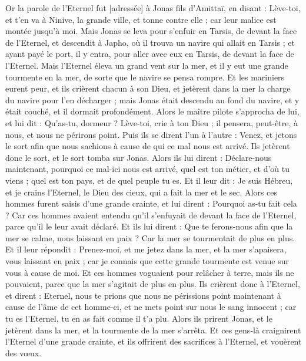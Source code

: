 \BFont
\begin{multicols}{2}
\VerseOne{}Or la parole de l'Eternel fut [adressée] à Jonas fils d'Amittaï, en disant :
Lève-toi, et t'en va à Ninive, la grande ville, et tonne contre elle ; car leur malice est montée jusqu'à moi.
Mais Jonas se leva pour s'enfuir en Tarsis, de devant la face de l'Eternel, et descendit à Japho, où il trouva un navire qui allait en Tarsis ; et ayant payé le port, il y entra, pour aller avec eux en Tarsis, de devant la face de l'Eternel.
Mais l'Eternel éleva un grand vent sur la mer, et il y eut une grande tourmente en la mer, de sorte que le navire se pensa rompre.
Et les mariniers eurent peur, et ils crièrent chacun à son Dieu, et jetèrent dans la mer la charge du navire pour l'en décharger ; mais Jonas était descendu au fond du navire, et y était couché, et il dormait profondément.
Alors le maître pilote s'approcha de lui, et lui dit : Qu'as-tu, dormeur ? Lève-toi, crie à ton Dieu ; il pensera, peut-être, à nous, et nous ne périrons point.
Puis ils se dirent l'un à l'autre : Venez, et jetons le sort afin que nous sachions à cause de qui ce mal nous est arrivé. Ils jetèrent donc le sort, et le sort tomba sur Jonas.
Alors ils lui dirent : Déclare-nous maintenant, pourquoi ce mal-ici nous est arrivé, quel est ton métier, et d'où tu viens ; quel est ton pays, et de quel peuple tu es.
Et il leur dit : Je suis Hébreu, et je crains l'Eternel, le Dieu des cieux, qui a fait la mer et le sec.
Alors ces hommes furent saisis d'une grande crainte, et lui dirent : Pourquoi as-tu fait cela ? Car ces hommes avaient entendu qu'il s'enfuyait de devant la face de l'Eternel, parce qu'il le leur avait déclaré.
Et ils lui dirent : Que te ferons-nous afin que la mer se calme, nous laissant en paix ? Car la mer se tourmentait de plus en plus.
Et il leur répondit : Prenez-moi, et me jetez dans la mer, et la mer s'apaisera, vous laissant en paix ; car je connais que cette grande tourmente est venue sur vous à cause de moi.
Et ces hommes voguaient pour relâcher à terre, mais ils ne pouvaient, parce que la mer s'agitait de plus en plus.
Ils crièrent donc à l'Eternel, et dirent : Eternel, nous te prions que nous ne périssions point maintenant à cause de l'âme de cet homme-ci, et ne mets point sur nous le sang innocent ; car tu es l'Eternel, tu en as fait comme il t'a plu.
Alors ils prirent Jonas, et le jetèrent dans la mer, et la tourmente de la mer s'arrêta.
Et ces gens-là craignirent l'Eternel d'une grande crainte, et ils offrirent des sacrifices à l'Eternel, et vouèrent des vœux.

\end{multicols}
